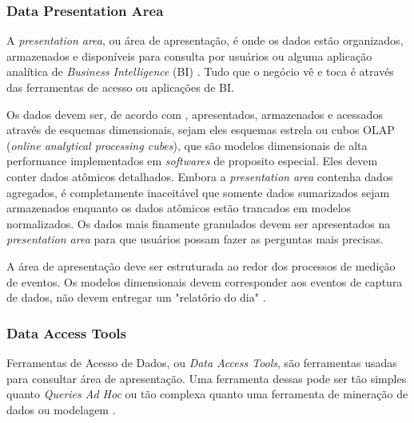 \subsubsection{Data Presentation Area}
A \textit{presentation area}, ou área de apresentação, é onde os dados estão organizados, armazenados e disponíveis para consulta por usuários ou alguma aplicação analítica de \textit{Business Intelligence} (BI) \citep{kimball2013}. Tudo que o negócio vê e toca é através das ferramentas de acesso ou aplicações de BI.

Os dados devem ser, de acordo com , apresentados, armazenados e acessados através de esquemas dimensionais, sejam eles esquemas estrela ou cubos OLAP (\textit{online analytical processing cubes}), que são modelos dimensionais de alta performance implementados em \textit{softwares} de proposito especial. Eles devem conter dados atômicos detalhados. Embora a \textit{presentation area} contenha dados agregados, é completamente inaceitável que somente dados sumarizados sejam armazenados enquanto os dados atômicos estão trancados em modelos normalizados. Os dados mais finamente granulados devem ser apresentados na \textit{presentation area} para que usuários possam fazer as perguntas mais precisas.

A área de apresentação deve ser estruturada ao redor dos processos de medição de eventos. Os modelos dimensionais devem corresponder aos eventos de captura de dados, não devem entregar um "relatório do dia" \citep{jmj}. 

\subsubsection{Data Access Tools} Ferramentas de Acesso de Dados, ou \textit{Data Access Tools}, são ferramentas usadas para consultar área de apresentação. Uma ferramenta dessas pode ser tão simples quanto \textit{Queries Ad Hoc} ou tão complexa quanto uma ferramenta de mineração de dados ou modelagem \citep{kimball2013}. 

